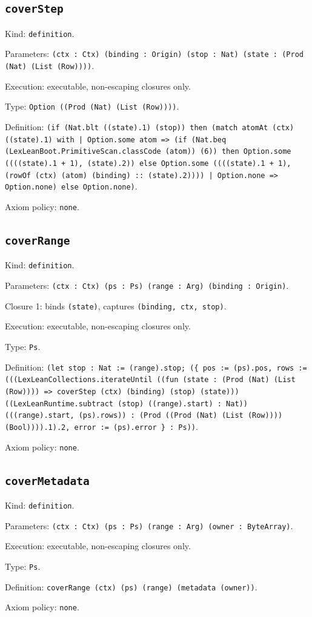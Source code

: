 \documentclass[11pt]{article}
\begin{document}
\subsection*{\texttt{coverStep}}
\noindent Kind: \texttt{definition}.\par
\noindent Parameters: \texttt{(ctx : Ctx) (binding : Origin) (stop : Nat) (state : (Prod (Nat) (List (Row))))}.\par
\noindent Execution: executable, non-escaping closures only.\par
\noindent Type: \texttt{Option ((Prod (Nat) (List (Row))))}.\par
\noindent Definition: \texttt{(if (Nat.blt ((state).1) (stop)) then (match atomAt (ctx) ((state).1) with | Option.some atom => (if (Nat.beq (LexLeanBoot.PrimitiveScan.classCode (atom)) (6)) then Option.some ((((state).1 + 1), (state).2)) else Option.some ((((state).1 + 1), (rowOf (ctx) (atom) (binding) :: (state).2)))) | Option.none => Option.none) else Option.none)}.\par
\noindent Axiom policy: \texttt{none}.\par
\subsection*{\texttt{coverRange}}
\noindent Kind: \texttt{definition}.\par
\noindent Parameters: \texttt{(ctx : Ctx) (ps : Ps) (range : Arg) (binding : Origin)}.\par
\noindent Closure 1: binds \texttt{(state)}, captures \texttt{(binding, ctx, stop)}.\par
\noindent Execution: executable, non-escaping closures only.\par
\noindent Type: \texttt{Ps}.\par
\noindent Definition: \texttt{(let stop : Nat := (range).stop; (\{ pos := (ps).pos, rows := (((LexLeanCollections.iterateUntil ((fun (state : (Prod (Nat) (List (Row)))) => coverStep (ctx) (binding) (stop) (state))) ((LexLeanRuntime.subtract (stop) ((range).start) : Nat)) (((range).start, (ps).rows)) : (Prod ((Prod (Nat) (List (Row)))) (Bool)))).1).2, error := (ps).error \} : Ps))}.\par
\noindent Axiom policy: \texttt{none}.\par
\subsection*{\texttt{coverMetadata}}
\noindent Kind: \texttt{definition}.\par
\noindent Parameters: \texttt{(ctx : Ctx) (ps : Ps) (range : Arg) (owner : ByteArray)}.\par
\noindent Execution: executable, non-escaping closures only.\par
\noindent Type: \texttt{Ps}.\par
\noindent Definition: \texttt{coverRange (ctx) (ps) (range) (metadata (owner))}.\par
\noindent Axiom policy: \texttt{none}.\par
\end{document}
